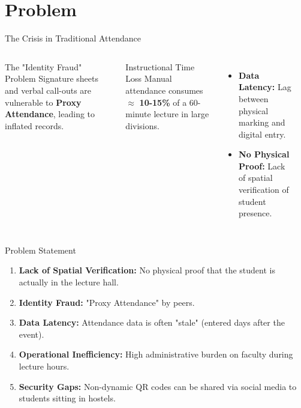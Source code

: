 \documentclass[10pt, aspectratio=169]{beamer}
\begin{document}
\section{Problem}
\begin{frame}{The Crisis in Traditional Attendance}
    \begin{columns}
        \begin{block}{The "Identity Fraud" Problem}
            Signature sheets and verbal call-outs are vulnerable to \textbf{Proxy Attendance}, leading to inflated records.
        \end{block}
        \begin{block}{Instructional Time Loss}
            Manual attendance consumes $\approx$ \textbf{10-15\%} of a 60-minute lecture in large divisions.
        \end{block}
        \begin{itemize}
            \item \textbf{Data Latency:} Lag between physical marking and digital entry.
            \item \textbf{No Physical Proof:} Lack of spatial verification of student presence.
        \end{itemize}
        \begin{center}
        \end{center}
    \end{columns}
\end{frame}

\begin{frame}{Problem Statement}
    \begin{enumerate}
        \item \textbf{Lack of Spatial Verification:} No physical proof that the student is actually in the lecture hall.
        \item \textbf{Identity Fraud:} "Proxy Attendance" by peers.
        \item \textbf{Data Latency:} Attendance data is often "stale" (entered days after the event).
        \item \textbf{Operational Inefficiency:} High administrative burden on faculty during lecture hours.
        \item \textbf{Security Gaps:} Non-dynamic QR codes can be shared via social media to students sitting in hostels.
    \end{enumerate}
\end{frame}
\end{document}

